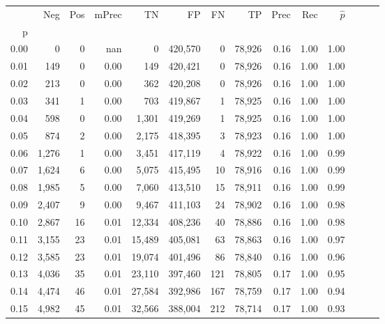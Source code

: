 \begin{tabular}{rrrrrrrrrrrrrr}
\toprule
{} &     Neg &    Pos & mPrec &       TN &       FP &      FN &      TP &  Prec &   Rec & $\hat{p}$ \\
p    &         &        &       &          &          &         &         &       &       &           \\
\midrule
0.00 &       0 &      0 &   nan &        0 &  420,570 &       0 &  78,926 &  0.16 &  1.00 &      1.00 \\
0.01 &     149 &      0 &  0.00 &      149 &  420,421 &       0 &  78,926 &  0.16 &  1.00 &      1.00 \\
0.02 &     213 &      0 &  0.00 &      362 &  420,208 &       0 &  78,926 &  0.16 &  1.00 &      1.00 \\
0.03 &     341 &      1 &  0.00 &      703 &  419,867 &       1 &  78,925 &  0.16 &  1.00 &      1.00 \\
0.04 &     598 &      0 &  0.00 &    1,301 &  419,269 &       1 &  78,925 &  0.16 &  1.00 &      1.00 \\
0.05 &     874 &      2 &  0.00 &    2,175 &  418,395 &       3 &  78,923 &  0.16 &  1.00 &      1.00 \\
0.06 &   1,276 &      1 &  0.00 &    3,451 &  417,119 &       4 &  78,922 &  0.16 &  1.00 &      0.99 \\
0.07 &   1,624 &      6 &  0.00 &    5,075 &  415,495 &      10 &  78,916 &  0.16 &  1.00 &      0.99 \\
0.08 &   1,985 &      5 &  0.00 &    7,060 &  413,510 &      15 &  78,911 &  0.16 &  1.00 &      0.99 \\
0.09 &   2,407 &      9 &  0.00 &    9,467 &  411,103 &      24 &  78,902 &  0.16 &  1.00 &      0.98 \\
0.10 &   2,867 &     16 &  0.01 &   12,334 &  408,236 &      40 &  78,886 &  0.16 &  1.00 &      0.98 \\
0.11 &   3,155 &     23 &  0.01 &   15,489 &  405,081 &      63 &  78,863 &  0.16 &  1.00 &      0.97 \\
0.12 &   3,585 &     23 &  0.01 &   19,074 &  401,496 &      86 &  78,840 &  0.16 &  1.00 &      0.96 \\
0.13 &   4,036 &     35 &  0.01 &   23,110 &  397,460 &     121 &  78,805 &  0.17 &  1.00 &      0.95 \\
0.14 &   4,474 &     46 &  0.01 &   27,584 &  392,986 &     167 &  78,759 &  0.17 &  1.00 &      0.94 \\
0.15 &   4,982 &     45 &  0.01 &   32,566 &  388,004 &     212 &  78,714 &  0.17 &  1.00 &      0.93 \\

\end{tabular}
